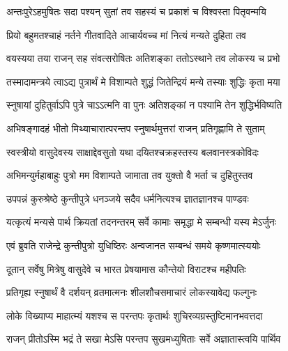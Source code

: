 


\twolineshloka
{अन्तःपुरेऽहमुषितः सदा पश्यन् सुतां तव}
{सहस्यं च प्रकाशं च विश्वस्ता पितृवन्मयि}


\twolineshloka
{प्रियो बहुमतश्चाहं नर्तने गीतवादिते}
{आचार्यवच्च मां नित्यं मन्यते दुहिता तव}


\twolineshloka
{वयस्यया तया राजन् सह संवत्सरोषितः}
{अतिशङ्का ततोऽस्थाने तव लोकस्य च प्रभो}


\twolineshloka
{तस्मादामन्त्रये त्वाऽद्य पुत्रार्थं मे विशाम्पते}
{शुद्धं जितेन्द्रियं मन्ये तस्याः शुद्धिः कृता मया}


\twolineshloka
{स्नुषायां दुहितुर्वाऽपि पुत्रे चाऽऽत्मनि वा पुनः}
{अतिशङ्कां न पश्यामि तेन शुद्धिर्भविष्यति}


\twolineshloka
{अभिषङ्गादहं भीतो मिथ्याचारात्परन्तप}
{स्नुषार्थमुत्तरां राजन् प्रतिगृह्णामि ते सुताम्}


\twolineshloka
{स्वस्त्रीयो वासुदेवस्य साक्षाद्देवसुतो यथा}
{दयितश्चक्रहस्तस्य बलवानस्त्रकोविदः}


\twolineshloka
{अभिमन्युर्महाबाहुः पुत्रो मम विशाम्पते}
{जामाता तव युक्तो वै भर्ता च दुहितुस्तव}




\twolineshloka
{उपपन्नं कुरुश्रेष्ठे कुन्तीपुत्रे धनञ्जये}
{सदैव धर्मनित्यश्च ज्ञातज्ञानश्च पाण्डवः}


\twolineshloka
{यत्कृत्यं मन्यसे पार्थ क्रियतां तदनन्तरम्}
{सर्वे कामाः समृद्धा मे सम्बन्धी यस्य मेऽर्जुनः}



\twolineshloka
{एवं ब्रुवति राजेन्द्रे कुन्तीपुत्रो युधिष्ठिरः}
{अन्वजानत सम्बन्धं समये कृष्णमात्स्ययोः}


\twolineshloka
{दूतान् सर्वेषु मित्रेषु वासुदेवे च भारत}
{प्रेषयामास कौन्तेयो विराटश्च महीपतिः}



\twolineshloka
{प्रतिगृह्य स्नुषार्थं वै दर्शयन् व्रतमात्मनः}
{शीलशौचसमाचारं लोकस्यावेद्य फल्गुनः}


\twolineshloka
{लोके विख्याप्य माहात्म्यं यशश्च स परन्तपः}
{कृतार्थः शुचिरव्यग्रस्तुष्टिमानभवत्तदा}




\twolineshloka
{राजन् प्रीतोऽस्मि भद्रं ते सखा मेऽसि परन्तप}
{सुखमध्युषिताः सर्वे अज्ञातास्त्वयि पार्थिव}



